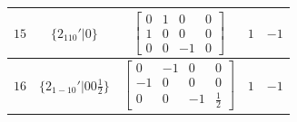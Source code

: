 \documentclass[fleqn,8pt]{jsarticle}
\begin{document}
\begin{longtable}{ccccc}
$ 15 $ & $ \{2{}_{110}{}'|0\} $ & $ \begin{bmatrix} 0 & 1 & 0 & 0 \\ 1 & 0 & 0 & 0 \\ 0 & 0 & -1 & 0 \end{bmatrix} $ & $ 1 $ & $ -1 $ \\ \hline
$ 16 $ & $ \{2{}_{1-10}{}'|0 0 \frac{1}{2}\} $ & $ \begin{bmatrix} 0 & -1 & 0 & 0 \\ -1 & 0 & 0 & 0 \\ 0 & 0 & -1 & \frac{1}{2} \end{bmatrix} $ & $ 1 $ & $ -1 $ \\
\end{longtable}
\end{document}
